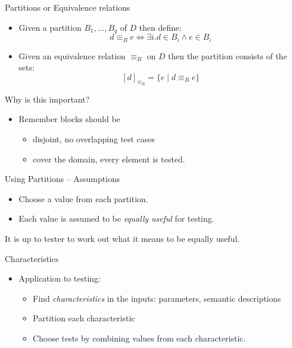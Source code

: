 \documentclass{beamer}
\begin{document}
\begin{frame}{Partitions or Equivalence relations} 
  \begin{itemize}
  \item Given a partition $B_1,\ldots ,  B_q$ of $D$ then define:
    \[
      d \equiv_B e \Leftrightarrow \exists i. d \in B_i \land e \in B_i
    \]
  \item Given an equivalence relation $\equiv_B$ on $D$ then the
    partition consists of the sets:
    \[
    [d]_{\equiv_B} = \{ e \mid d \equiv_B e \}
    \]  
  \end{itemize}
  
\end{frame}
\begin{frame}{Why is this important?}
  \begin{itemize}
  \item Remember blocks should be 
    \begin{itemize}
    \item disjoint, no overlapping test cases
    \item cover the domain, every element is tested.
    \end{itemize}
  \end{itemize}  
\end{frame}
\begin{frame}{Using Partitions -- Assumptions}
  \begin{itemize}
  \item Choose a value from each partition.
  \item Each value is assumed to be {\em equally useful} for testing.
  \end{itemize}
It is up to tester to work out what it means to be equally useful.
\end{frame}
\begin{frame}{Characteristics}
  \begin{itemize}
  \item Application to testing:
    \begin{itemize}
    \item Find {\em characteristics} in the inputs: parameters,
      semantic descriptions
    \item Partition each characteristic
    \item Choose tests by combining values from each characteristic.
    \end{itemize}
  \end{itemize}  
\end{frame}
\end{document}
